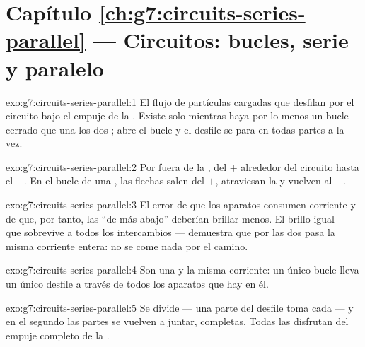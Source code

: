 \section*{Capítulo \ref{ch:g7:circuits-series-parallel} --- Circuitos: bucles, serie y paralelo}

\begin{solution}{exo:g7:circuits-series-parallel:1}
El flujo de partículas cargadas que desfilan por el circuito bajo el
empuje de la . Existe solo mientras haya por lo menos un bucle
cerrado que una los dos ; abre el bucle y el desfile se para
en todas partes a la vez.
\end{solution}

\begin{solution}{exo:g7:circuits-series-parallel:2}
Por fuera de la , del $+$ alrededor del circuito hasta el $-$.
En el bucle de una , las flechas salen del $+$, atraviesan
la  y vuelven al $-$.
\end{solution}

\begin{solution}{exo:g7:circuits-series-parallel:3}
El error de que los aparatos consumen corriente y de que, por tanto,
las  ``de más abajo'' deberían brillar menos. El brillo
igual --- que sobrevive a todos los intercambios --- demuestra que por
las dos pasa la misma corriente entera: no se come nada por el camino.
\end{solution}

\begin{solution}{exo:g7:circuits-series-parallel:4}
Son una y la misma corriente: un único bucle lleva un único desfile a
través de todos los aparatos que hay en él.
\end{solution}

\begin{solution}{exo:g7:circuits-series-parallel:5}
Se divide --- una parte del desfile toma cada  --- y en el
segundo  las partes se vuelven a juntar, completas. Todas las
 disfrutan del empuje completo de la .
\end{solution}

